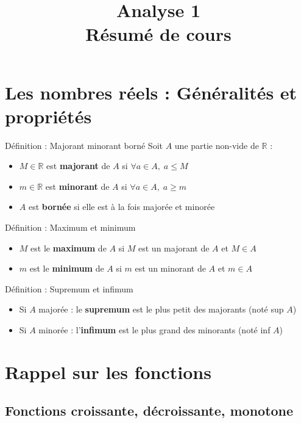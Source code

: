 \documentclass[a4paper,11pt]{article}
\title{\textbf{Analyse 1} \\ Résumé de cours}
\author{}
\date{}
\begin{document}
\maketitle
\tableofcontents
\newpage

\section{Les nombres réels : Généralités et propriétés}

\begin{defbox}{Définition : Majorant minorant borné}
Soit $A$ une partie non-vide de $\mathbb{R}$ :
\begin{itemize}
    \item $M \in \mathbb{R}$ est \textbf{majorant} de $A$ si $\forall a \in A, \; a \leq M$
    \item $m \in \mathbb{R}$ est \textbf{minorant} de $A$ si $\forall a \in A, \; a \geq m$
    \item $A$ est \textbf{bornée} si elle est à la fois majorée et minorée
\end{itemize}
\end{defbox}

\begin{defbox}{Définition : Maximum et minimum}
\begin{itemize}
    \item $M$ est le \textbf{maximum} de $A$ si $M$ est un majorant de $A$ et $M \in A$
    \item $m$ est le \textbf{minimum} de $A$ si $m$ est un minorant de $A$ et $m \in A$
\end{itemize}
\end{defbox}

\begin{defbox}{Définition : Supremum et infimum}
\begin{itemize}
    \item Si $A$ majorée : le \textbf{supremum} est le plus petit des majorants (noté sup $A$)
    \item Si $A$ minorée : l'\textbf{infimum} est le plus grand des minorants (noté inf $A$)
\end{itemize}
\end{defbox}

\section{Rappel sur les fonctions}

\subsection{Fonctions croissante, décroissante, monotone}
\end{document}
